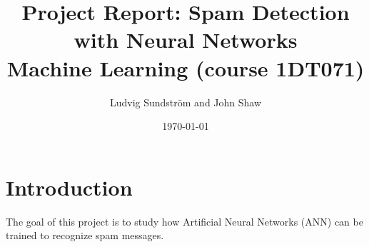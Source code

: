 \documentclass[a4paper,11pt]{article}
\title{\textbf{Project Report: Spam Detection with Neural Networks} \\
    \textbf{Machine Learning (course 1DT071)} \\  
}
\author{Ludvig Sundstr\"{o}m and John Shaw}
\date{\today}
\begin{document}
\maketitle
\newpage
\tableofcontents
\newpage

\section{Introduction} 
  The goal of this project is to study how Artificial Neural Networks (ANN) can
  be trained to recognize spam messages.










\end{document}
